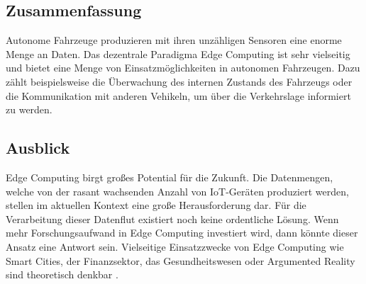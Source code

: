 \documentclass{sigchi}
\begin{document}
\subsection{Zusammenfassung}
Autonome Fahrzeuge produzieren mit ihren unzähligen Sensoren eine enorme Menge an Daten. Das dezentrale Paradigma Edge Computing ist sehr vielseitig und bietet eine Menge von Einsatzmöglichkeiten in autonomen Fahrzeugen. Dazu zählt beispielsweise die Überwachung des internen Zustands des Fahrzeugs oder die Kommunikation mit anderen Vehikeln, um über die Verkehrslage informiert zu werden.

\subsection{Ausblick}
Edge Computing birgt großes Potential für die Zukunft. Die Datenmengen, welche von der rasant wachsenden Anzahl von IoT-Geräten produziert werden, stellen im aktuellen Kontext eine große Herausforderung dar. Für die Verarbeitung dieser Datenflut existiert noch keine ordentliche Lösung. Wenn mehr Forschungsaufwand in Edge Computing investiert wird, dann könnte dieser Ansatz eine Antwort sein. Vielseitige Einsatzzwecke von Edge Computing wie Smart Cities, der Finanzsektor, das Gesundheitswesen oder Argumented Reality sind theoretisch denkbar \cite{5-use-cases-1:2019}.
\newpage

\balance{}



\end{document}
